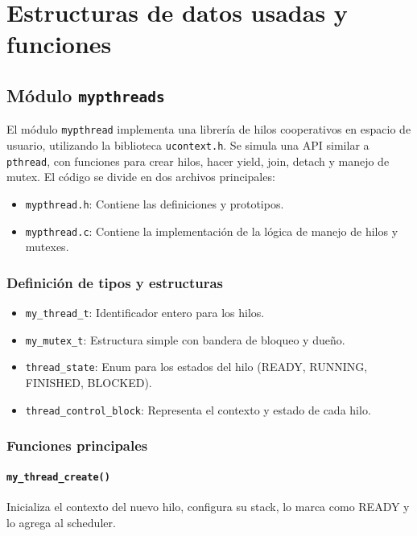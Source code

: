 \documentclass[12pt]{article}
\begin{document}
\section{Estructuras de datos usadas y funciones}


\subsection{Módulo \texttt{mypthreads}}



El módulo \texttt{mypthread} implementa una librería de hilos cooperativos en espacio de usuario, utilizando la biblioteca \texttt{ucontext.h}. Se simula una API similar a \texttt{pthread}, con funciones para crear hilos, hacer yield, join, detach y manejo de mutex. El código se divide en dos archivos principales:

\begin{itemize}
    \item \texttt{mypthread.h}: Contiene las definiciones y prototipos.
    \item \texttt{mypthread.c}: Contiene la implementación de la lógica de manejo de hilos y mutexes.
\end{itemize}

\subsubsection*{Definición de tipos y estructuras}

\begin{itemize}
    \item \texttt{my\_thread\_t}: Identificador entero para los hilos.
    \item \texttt{my\_mutex\_t}: Estructura simple con bandera de bloqueo y dueño.
    \item \texttt{thread\_state}: Enum para los estados del hilo (READY, RUNNING, FINISHED, BLOCKED).
    \item \texttt{thread\_control\_block}: Representa el contexto y estado de cada hilo.
\end{itemize}

\subsubsection*{Funciones principales}

\paragraph{\texttt{my\_thread\_create()}} Inicializa el contexto del nuevo hilo, configura su stack, lo marca como READY y lo agrega al scheduler.
\end{document}
